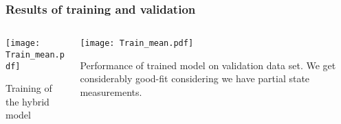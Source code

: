 \documentclass[dvipsnames, 9pt]{beamer}
\begin{document}
\begin{frame}
\begin{columns}
\begin{column}{0.4\textwidth}
\begin{figure}
 \end{figure}
        \end{column}
    \end{columns}
\end{frame}


\begin{frame}
    \frametitle{Results of training and validation}
    
    \begin{columns}
    {   \begin{column}{0.5\textwidth}
        \texttt{[image: Train\_mean.pdf]}
        \begin{center}
        \scriptsize{Training of the hybrid model}
        \end{center}
        \end{column}}
        \begin{column}{0.5\textwidth}
        \vspace{4mm}
        \texttt{[image: Train\_mean.pdf]}
        \begin{center}
        \scriptsize{Performance of trained model on validation data set. We get considerably good-fit considering we have partial state measurements.}
        \end{center}
        \end{column}
    \end{columns}
\end{frame}
\end{document}

